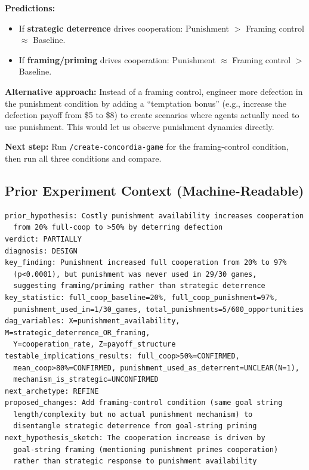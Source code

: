\documentclass[11pt]{article}
\begin{document}
\textbf{Predictions:}
\begin{itemize}
\item If \textbf{strategic deterrence} drives cooperation: Punishment $>$ Framing control $\approx$ Baseline.
\item If \textbf{framing/priming} drives cooperation: Punishment $\approx$ Framing control $>$ Baseline.
\end{itemize}

\textbf{Alternative approach:} Instead of a framing control, engineer more defection in the punishment condition by adding a ``temptation bonus'' (e.g., increase the defection payoff from \$5 to \$8) to create scenarios where agents actually need to use punishment. This would let us observe punishment dynamics directly.

\textbf{Next step:} Run \texttt{/create-concordia-game} for the framing-control condition, then run all three conditions and compare.

\subsection*{Prior Experiment Context (Machine-Readable)}
\begin{verbatim}
prior_hypothesis: Costly punishment availability increases cooperation
  from 20% full-coop to >50% by deterring defection
verdict: PARTIALLY
diagnosis: DESIGN
key_finding: Punishment increased full cooperation from 20% to 97%
  (p<0.0001), but punishment was never used in 29/30 games,
  suggesting framing/priming rather than strategic deterrence
key_statistic: full_coop_baseline=20%, full_coop_punishment=97%,
  punishment_used_in=1/30_games, total_punishments=5/600_opportunities
dag_variables: X=punishment_availability, M=strategic_deterrence_OR_framing,
  Y=cooperation_rate, Z=payoff_structure
testable_implications_results: full_coop>50%=CONFIRMED,
  mean_coop>80%=CONFIRMED, punishment_used_as_deterrent=UNCLEAR(N=1),
  mechanism_is_strategic=UNCONFIRMED
next_archetype: REFINE
proposed_changes: Add framing-control condition (same goal string
  length/complexity but no actual punishment mechanism) to
  disentangle strategic deterrence from goal-string priming
next_hypothesis_sketch: The cooperation increase is driven by
  goal-string framing (mentioning punishment primes cooperation)
  rather than strategic response to punishment availability
\end{verbatim}
\end{document}
